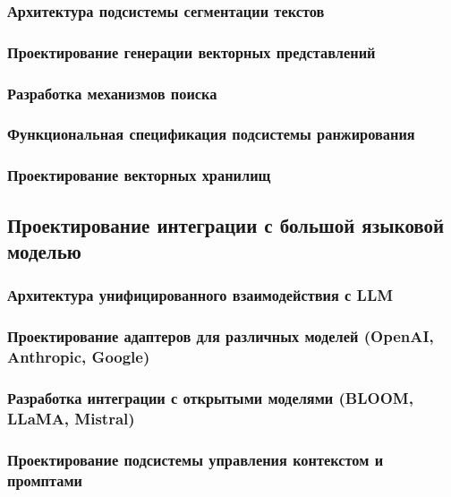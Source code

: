 \documentclass{syksu-coursework}
\begin{document}
\subsubsection{Архитектура подсистемы сегментации текстов}

\subsubsection{Проектирование генерации векторных представлений}

\subsubsection{Разработка механизмов поиска}

\subsubsection{Функциональная спецификация подсистемы ранжирования}

\subsubsection{Проектирование векторных хранилищ}

\subsection{Проектирование интеграции с большой языковой моделью}

\subsubsection{Архитектура унифицированного взаимодействия с LLM}

\subsubsection{Проектирование адаптеров для различных моделей (OpenAI, Anthropic, Google)}

\subsubsection{Разработка интеграции с открытыми моделями (BLOOM, LLaMA, Mistral)}

\subsubsection{Проектирование подсистемы управления контекстом и промптами}
\end{document}
